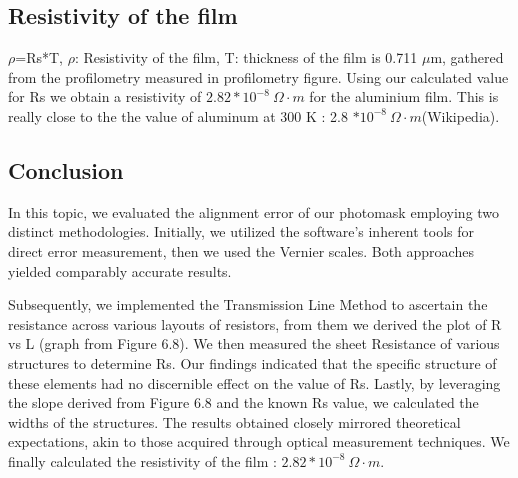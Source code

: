 \subsection*{Resistivity of the film}
$\rho$=Rs*T, $\rho$: Resistivity of the film, T: thickness of the film is 0.711 $\mu$m, gathered from the profilometry measured in profilometry figure. Using our calculated value for Rs we obtain a resistivity of $2.82 * 10^{-8} \ \Omega \cdot m$ for the aluminium film. This is really close to the the value of aluminum at 300 K : 2.8 $* 10^{-8} \ \Omega \cdot m$(Wikipedia).





\subsection{Conclusion}
In this topic, we evaluated the alignment error of our photomask employing two distinct methodologies. Initially, we utilized the software's inherent tools for direct error measurement, then we used the Vernier scales. Both approaches yielded comparably accurate results.

Subsequently, we implemented the Transmission Line Method to ascertain the resistance across various layouts of resistors, from them we derived the plot of R vs L (graph from Figure 6.8). We then measured the sheet Resistance of various structures to determine Rs. Our findings indicated that the specific structure of these elements had no discernible effect on the value of Rs.
Lastly, by leveraging the slope derived from Figure 6.8 and the known Rs value, we calculated the widths of the structures. The results obtained closely mirrored theoretical expectations, akin to those acquired through optical measurement techniques.
We finally calculated the resistivity of the film : $2.82 * 10^{-8} \ \Omega \cdot m$. 